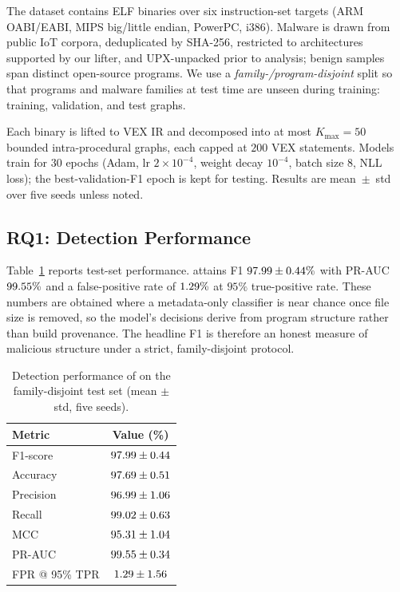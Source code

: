 \documentclass{llncs}
\begin{document}
The dataset contains \dsTotal{} ELF binaries over six instruction-set
targets (ARM OABI/EABI, MIPS big/little endian, PowerPC, i386). Malware is
drawn from public IoT corpora, deduplicated by SHA-256, restricted to
architectures supported by our lifter, and UPX-unpacked prior to analysis;
benign samples span \dsBenignProg{} distinct open-source programs. We use a
\emph{family-/program-disjoint} split so that programs and malware
families at test time are unseen during training: \dsTrain{} training,
\dsVal{} validation, and \dsTest{} test graphs.

Each binary is lifted to VEX IR and decomposed into at most $K_{\max}=50$
bounded intra-procedural graphs, each capped at $200$ VEX statements.
Models train for $30$ epochs (Adam, lr $2\times10^{-4}$, weight decay
$10^{-4}$, batch size $8$, NLL loss); the best-validation-F1 epoch is kept
for testing. Results are mean~$\pm$~std over five seeds unless noted.

\subsection{RQ1: Detection Performance}
\label{sec:detection}

Table~\ref{tab:detection} reports test-set performance. 
attains F1 $97.99{}\pm0.44{}\%$ with PR-AUC $99.55{}\%$ and a
false-positive rate of $1.29{}\%$ at $95\%$ true-positive rate. These
numbers are obtained where a metadata-only classifier is near chance once
file size is removed, so the model's decisions derive from program
structure rather than build provenance. The headline F1 is therefore an
honest measure of malicious structure under a strict, family-disjoint
protocol.

\begin{table}[t]
\centering
\caption{Detection performance of  on the family-disjoint test
set (mean $\pm$ std, five seeds).}
\label{tab:detection}
\begin{tabular}{lc}
\hline
Metric & Value (\%) \\
\hline
F1-score        & $97.99 \pm 0.44$ \\
Accuracy        & $97.69 \pm 0.51$ \\
Precision       & $96.99 \pm 1.06$ \\
Recall          & $99.02 \pm 0.63$ \\
MCC             & $95.31 \pm 1.04$ \\
PR-AUC          & $99.55 \pm 0.34$ \\
FPR @ 95\% TPR  & $1.29 \pm 1.56$ \\
\hline
\end{tabular}
\end{table}
\end{document}

